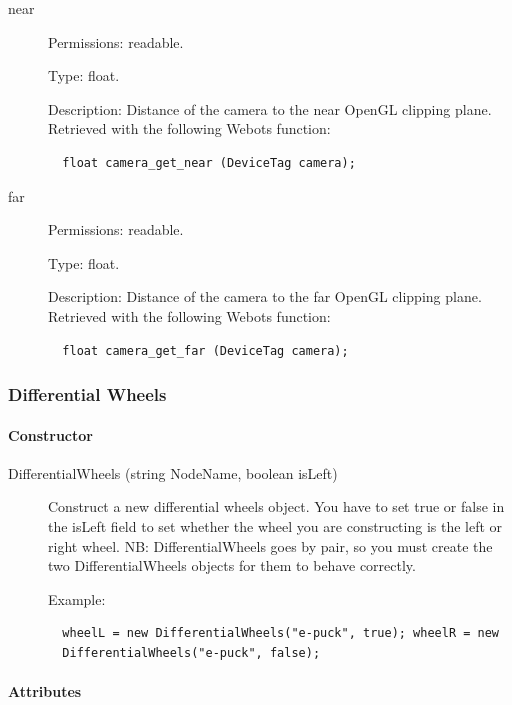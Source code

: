 \begin{description}
\item[{near}] Permissions: readable.


  Type: float.


  Description: Distance of the camera to the near OpenGL clipping
  plane.  Retrieved with the following Webots function:


\begin{lstlisting}
  float camera_get_near (DeviceTag camera);
\end{lstlisting}
\item[{far}] Permissions: readable.


  Type: float.


  Description: Distance of the camera to the far OpenGL clipping
  plane.  Retrieved with the following Webots function:


\begin{lstlisting}
  float camera_get_far (DeviceTag camera);
\end{lstlisting}
\end{description}

\subsubsection{Differential Wheels}
\label{webots.uobjects.robotdevices.differentialwheels}%

\paragraph{Constructor}
\label{webots.uobjects.robotdevices.differentialwheels.constructor}%

\noindent
\begin{description}
\item[{DifferentialWheels (string NodeName, boolean isLeft)}]
  Construct a new differential wheels object. You have to set true or
  false in the isLeft field to set whether the wheel you are
  constructing is the left or right wheel.  NB: DifferentialWheels
  goes by pair, so you must create the two DifferentialWheels objects
  for them to behave correctly.

  Example:

\begin{lstlisting}
  wheelL = new DifferentialWheels("e-puck", true); wheelR = new
  DifferentialWheels("e-puck", false);
\end{lstlisting}
\end{description}

\paragraph{Attributes}
\label{webots.uobjects.robotdevices.differentialwheels.attributes}%

